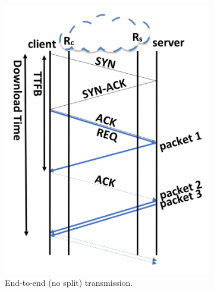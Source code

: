 \begin{figure}[!t]
\begin{subfigure}{0.65\columnwidth}
  \includegraphics[width=\columnwidth]{figures/e2e.png}
    \caption{End-to-end (no split) transmission.} \label{fig:e2e}
\end{subfigure}    \centering
\begin{subfigure}{0.65\columnwidth}
  \centering

\end{subfigure}
\end{figure}
